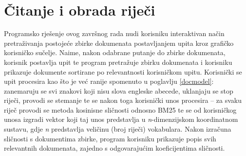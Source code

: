 \documentclass[times, utf8, zavrsni, numeric]{fer}
\begin{document}
\section{Čitanje i obrada riječi}
Programsko rješenje ovog završnog rada nudi korisniku interaktivan način pretraživanja postojeće zbirke dokumenata postavljanjem upita kroz grafičko korisničko sučelje. Naime, nakon odabrane putanje do zbirke dokumenata, korisnik postavlja upit te program pretražuje zbirku dokumenata i korisniku prikazuje dokumente sortirane po relevantnosti korisničkom upitu.
Korisnički se upit procesira kao što je već ranije spomenuto u poglavlju \ref{docmodel}: zanemaruju se svi znakovi koji nisu slova engleske abecede, uklanjaju se stop riječi, provodi se stemanje te se nakon toga korisnički unos procesira -- za svaku riječ provodi se metoda kosinisne sličnosti odnosno BM25 te se od korisničkog unosa izgradi vektor koji taj unos predstavlja u \textit{n}-dimenzijskom koordinatnom sustavu, gdje \textit{n} predstavlja veličinu (broj riječi) vokabulara. Nakon izračuna sličnosti s dokumentima zbirke, program korisniku prikazuje popis svih relevantnih dokumenata, zajedno s odgovarajućim koeficijentima sličnosti.
\end{document}

